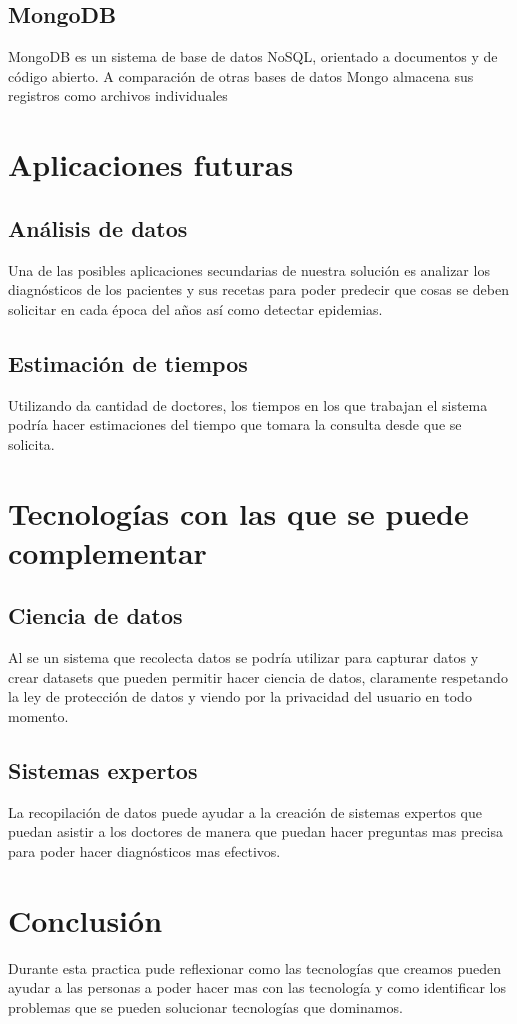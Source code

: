\documentclass[11pt]{article}
\begin{document}
\subsection{MongoDB}
\label{sec:org5b0ef68}
MongoDB es un sistema de base de datos NoSQL, orientado a documentos y de código 
abierto. A comparación de otras bases de datos Mongo almacena sus registros como
archivos individuales

\section{Aplicaciones futuras}
\label{sec:org405f85d}
\subsection{Análisis de datos}
\label{sec:orgaea0120}
Una de las posibles aplicaciones secundarias de nuestra solución es analizar
los diagnósticos de los pacientes y sus recetas para poder predecir que cosas
se deben solicitar en cada época del años así como detectar epidemias. 

\subsection{Estimación de tiempos}
\label{sec:org7eaa545}
Utilizando da cantidad de doctores, los tiempos en los que trabajan el sistema 
podría hacer estimaciones del tiempo que tomara la consulta desde que se 
solicita.

\section{Tecnologías con las que se puede complementar}
\label{sec:orgc7ba471}
\subsection{Ciencia de datos}
\label{sec:org4730ad9}
Al se un sistema que recolecta datos se podría utilizar para capturar datos y 
crear datasets que pueden permitir hacer ciencia de datos, claramente 
respetando la ley de protección de datos y viendo por la privacidad del 
usuario en todo momento.

\subsection{Sistemas expertos}
\label{sec:org4fabd26}
La recopilación de datos puede ayudar a la creación de sistemas expertos que 
puedan asistir a los doctores de manera que puedan hacer preguntas mas 
precisa para poder hacer diagnósticos mas efectivos.

\section{Conclusión}
\label{sec:org2f39734}
Durante esta practica pude reflexionar como las tecnologías que creamos pueden
ayudar a las personas a poder hacer mas con las tecnología y como identificar 
los problemas que se pueden solucionar tecnologías que dominamos.  
\end{document}
